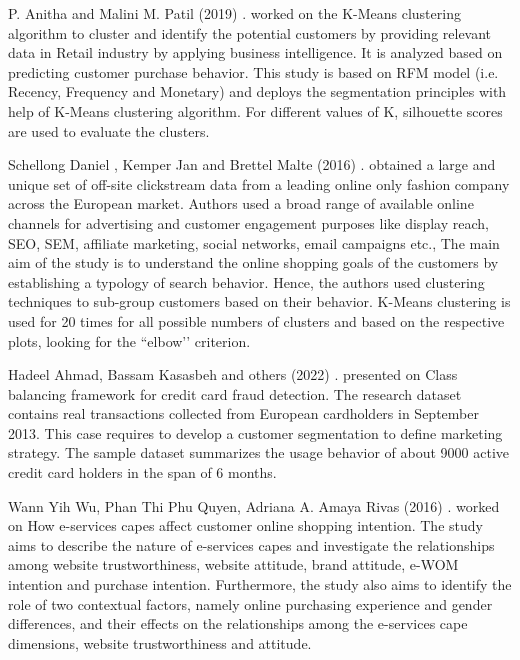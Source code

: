 \documentclass[conference]{IEEEtran}
\begin{document}
P. Anitha and Malini M. Patil (2019) \cite{b4}. worked on the K-Means clustering algorithm to cluster and identify the potential customers by providing relevant data in Retail industry by applying business intelligence. It is analyzed based on predicting customer purchase behavior. This study is based on RFM model (i.e. Recency, Frequency and Monetary) and deploys the segmentation principles with help of K-Means clustering algorithm. For different values of K, silhouette scores are used to evaluate the clusters.

Schellong Daniel , Kemper Jan and Brettel Malte (2016) \cite{b5}. obtained a large and unique set of off-site clickstream data from a leading online only fashion company across the European market. Authors used a broad range of available online channels for advertising and customer engagement purposes like display reach, SEO, SEM, affiliate marketing, social networks, email campaigns etc., The main aim of the study is to understand the online shopping goals of the customers by establishing a typology of search behavior. Hence, the authors used clustering techniques to sub-group customers based on their behavior. K-Means clustering is used for 20 times for all possible numbers of clusters and based on the respective plots, looking for the ``elbow’’ criterion.

Hadeel Ahmad, Bassam Kasasbeh and others (2022) \cite{b6}. presented on Class balancing framework for credit card fraud detection. The research dataset contains real transactions collected from European cardholders in September 2013. This case requires to develop a customer segmentation to define marketing strategy. The sample dataset summarizes the usage behavior of about 9000 active credit card holders in the span of 6 months.

Wann Yih Wu, Phan Thi Phu Quyen, Adriana A. Amaya Rivas (2016) \cite{b7}. worked on How e-services capes affect customer online shopping intention. The study aims to describe the nature of e-services capes and investigate the relationships among website trustworthiness, website attitude, brand attitude, e-WOM intention and purchase intention. Furthermore, the study also aims to identify the role of two contextual factors, namely online purchasing experience and gender differences, and their effects on the relationships among the e-services cape dimensions, website trustworthiness and attitude.
\end{document}
